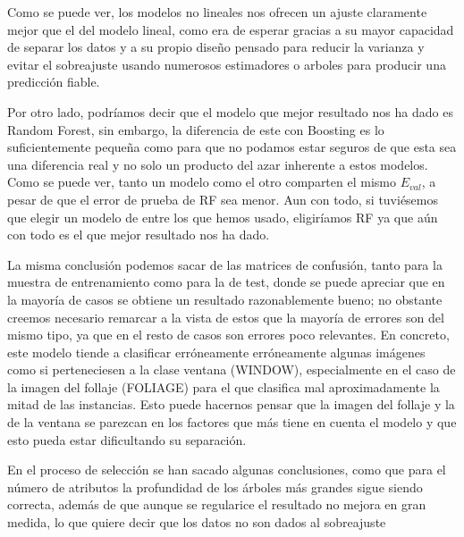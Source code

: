 \documentclass{article}
\begin{document}
	Como se puede ver, los modelos no lineales nos ofrecen un ajuste claramente mejor que el del modelo lineal, como era de esperar gracias a su mayor capacidad de separar los datos y a su propio diseño pensado para reducir la varianza y evitar el sobreajuste usando numerosos estimadores o arboles para producir una predicción fiable. 
	\par 
	Por otro lado, podríamos decir que el modelo que mejor resultado nos ha dado es Random Forest, sin embargo, la diferencia de este con Boosting es lo suficientemente pequeña como para que no podamos estar seguros de que esta sea una diferencia real y no solo un producto del azar inherente a estos modelos. Como se puede ver, tanto un modelo como el otro comparten el mismo $E_{val}$, a pesar de que el error de prueba de RF sea menor. Aun con todo, si tuviésemos que elegir un modelo de entre los que hemos usado, eligiríamos RF ya que aún con todo es el que mejor resultado nos ha dado.
	
	La misma conclusión podemos sacar de las matrices de confusión, tanto para la muestra de entrenamiento como para la de test, donde se puede apreciar que en la mayoría de casos se obtiene un resultado razonablemente bueno; no obstante creemos necesario remarcar a la vista de estos que la mayoría de errores son del mismo tipo, ya que en el resto de casos son errores poco relevantes. En concreto, este modelo tiende a clasificar erróneamente erróneamente algunas imágenes como si perteneciesen a la clase ventana (WINDOW), especialmente en el caso de la imagen del follaje (FOLIAGE) para el que clasifica mal aproximadamente la mitad de las instancias. Esto puede hacernos pensar que la imagen del follaje y la de la ventana se parezcan en los factores que más tiene en cuenta el modelo y que esto pueda estar dificultando su separación. %
	\par 
	En el proceso de selección se han sacado algunas conclusiones, como que para el número de atributos la profundidad de los árboles más grandes sigue siendo correcta, además de que aunque se regularice el resultado no mejora en gran medida, lo que quiere decir que los datos no son dados al sobreajuste %
	
\end{document}
